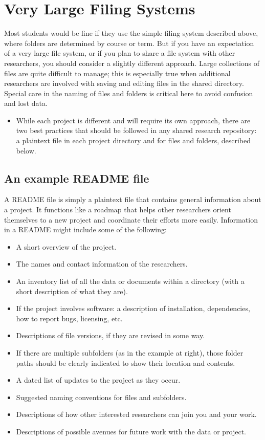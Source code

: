 \section{Very Large Filing Systems}

Most students would be fine if they use the simple filing system described above, where folders are determined by course or term. But if you have an expectation of a very large file system, or if you plan to share a file system with other researchers, you should consider a slightly different approach. Large collections of files are quite difficult to manage; this is especially true when additional researchers are involved with saving and editing files in the shared directory. Special care in the naming of files and folders is critical here to avoid confusion and lost data. 

\begin{itemize}
\item While each project is different and will require its own approach, there are two best practices that should be followed in any shared research repository: a plaintext  file in each project directory and  for files and folders, described below.  
\end{itemize}

\subsection{An example README file}

A README file is simply a plaintext file that contains general information about a project. It functions like a roadmap that helps other researchers orient themselves to a new project and coordinate their efforts more easily.  Information in a README might include some of the following:

\begin{itemize}
\item A short overview of the project.
\item The names and contact information of the researchers.
\item An inventory list of all the data or documents within a directory (with a short description of what they are). 
\item If the project involves software: a description of installation, dependencies, how to report bugs, licensing, etc.
\item Descriptions of file versions, if they are revised in some way.
\item If there are multiple subfolders (as in the example at right), those folder paths should be clearly indicated to show their location and contents.
\item A dated list of updates to the project as they occur. 
\item Suggested naming conventions for files and subfolders.
\item Descriptions of how other interested researchers can join you and your work.
\item Descriptions of possible avenues for future work with the data or project.

\end{itemize}

